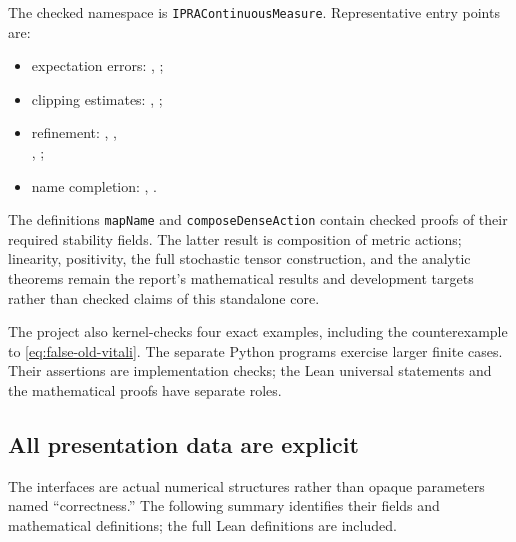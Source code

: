 The checked namespace is \texttt{IPRAContinuousMeasure}. Representative
entry points are:
\begin{itemize}
\item expectation errors: , ;
\item clipping estimates: , ;
\item refinement: , ,\\
      , ;
\item name completion: , .
\end{itemize}
The definitions \texttt{mapName} and
\texttt{composeDenseAction} contain checked proofs of their required
stability fields. The latter result is composition of metric actions;
linearity, positivity, the full stochastic tensor construction, and the
analytic theorems remain the report's mathematical results and development
targets rather than checked claims of this standalone core.

The project also kernel-checks four exact examples, including the
counterexample to \eqref{eq:false-old-vitali}. The separate Python programs
exercise larger finite cases. Their assertions are implementation checks;
the Lean universal statements and the mathematical proofs have separate
roles.

\subsection{All presentation data are explicit}

The interfaces are actual numerical structures rather than opaque
parameters named ``correctness.'' The following summary identifies their
fields and mathematical definitions; the full Lean definitions are included.

